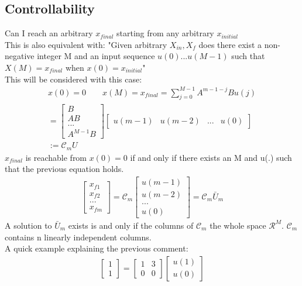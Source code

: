 \documentclass[a4paper,11pt]{article}
\begin{document}
	\subsection{Controllability} 
	Can I reach an arbitrary $x_{final}$ starting from any arbitrary $x_{initial}$   \\
	This is also equivalent with: "Given arbitrary $X_{in},X_{f}$ does there exist a non-negative integer M and an input sequence $u(0) ... u(M-1)$ such that$ X(M)=x_{final}$ when $x(0) = x_{initial}$"\\
	This will be considered with this case:\\
	\begin{gather}
	 x(0) = 0 \qquad x(M) = x_{final} = \sum^{M-1}_{j = 0}A^{m-1-j}Bu(j)\\
	 = 
	  		\begin{bmatrix} 
 			B \\ AB \\ ...\\ A^{M-1}B
 		\end{bmatrix}
 		 		 \begin{bmatrix} 
 			u(m-1)&u(m-2)&...&u(0)
 		\end{bmatrix}\\
 		:= \mathcal{C}_m  U 
	\end{gather}
	$x_{final}$ is reachable from $x(0)  = 0$ if and only if there exists an M and u(.) such that the previous equation holds.\\
	\begin{gather}
		\begin{bmatrix} 
	 		x_{f1}\\x_{f2}\\...\\x_{fm}
	 	\end{bmatrix}	
	 	= \mathcal{C}_m
	 	\begin{bmatrix} 
 			u(m-1)\\u(m-2)\\...\\u(0)
 		\end{bmatrix}
 		= \mathcal{C}_m \bar{U}_m
	\end{gather}
	A solution to $\bar{U}_m$ exists is and only if the columns of $\mathcal{C}_m$ the whole space $\mathcal{R}^M$. $\mathcal{C}_m$ contains n linearly independent columns. \\
	A quick example explaining the previous comment:\\
	\begin{gather}
		\begin{bmatrix}
			1\\1 
		\end{bmatrix}=
		\begin{bmatrix}
			1 & 3\\
			0 & 0 
		\end{bmatrix}
		\begin{bmatrix}
			u(1)\\u(0) 
		\end{bmatrix}
	\end{gather}
\end{document}
